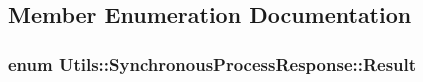 \subsection{Member Enumeration Documentation}
\hypertarget{struct_utils_1_1_synchronous_process_response_aa7b2d882cf93d074f4392e57a6603f2c}{
\subsubsection[{Result}]{\setlength{\rightskip}{0pt plus 5cm}enum {\bf Utils\-::\-Synchronous\-Process\-Response\-::\-Result}}}\label{struct_utils_1_1_synchronous_process_response_aa7b2d882cf93d074f4392e57a6603f2c}
